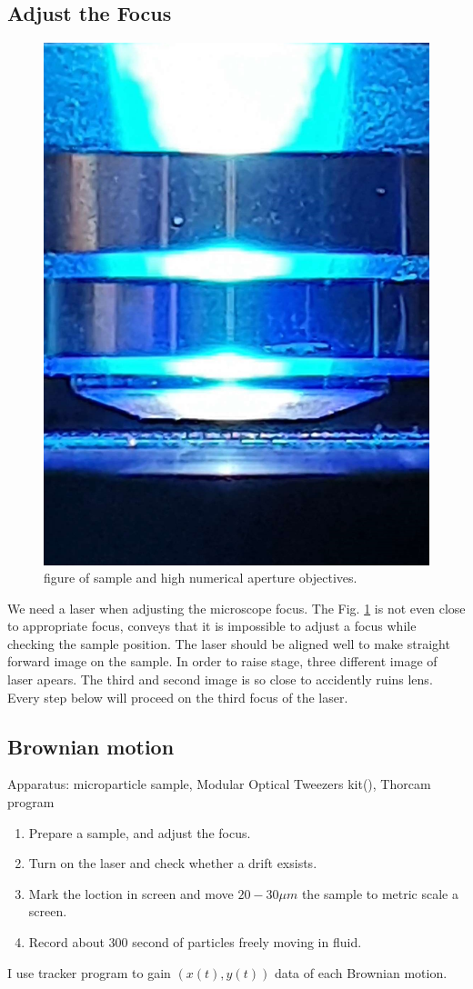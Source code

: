 \documentclass{article}
\begin{document}
\subsection{Adjust the Focus}
\begin{figure}[h]
    \centering
    \includegraphics[width=0.3\linewidth]{../results/microscope_focusing.png}
    \caption{figure of sample and high numerical aperture objectives.}
    \label{Figure:microscope_focusing}
\end{figure}
We need a laser when adjusting the microscope focus.
The Fig. \ref{Figure:microscope_focusing} is not even close to appropriate focus, conveys that it is impossible to adjust a focus while checking the sample position.
The laser should be aligned well to make straight forward image on the sample.
In order to raise stage, three different image of laser apears.
The third and second image is so close to accidently ruins lens.
Every step below will proceed on the third focus of the laser.


\subsection{Brownian motion}
\noindent
Apparatus:
microparticle sample, Modular Optical Tweezers kit(\cite{opticaltweezermodule}), Thorcam program

\begin{enumerate}
    \item Prepare a sample, and adjust the focus.
    \item Turn on the laser and check whether a drift exsists.
    \item Mark the loction in screen and move $20-30 \mu m$ the sample to metric scale a screen.
    \item Record about 300 second of particles freely moving in fluid.
\end{enumerate}

I use tracker program to gain $(x(t),y(t))$ data of each Brownian motion.
\end{document}
